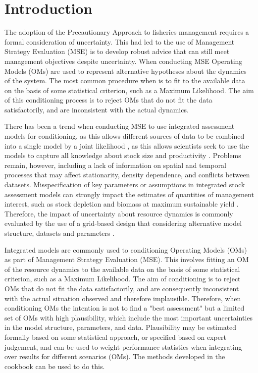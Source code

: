 \section*{Introduction}


The adoption of the Precautionary Approach to fisheries management \citep[PA,][]{garcia1996precautionary} requires a formal consideration of uncertainty. This had led to the use of Management Strategy Evaluation (MSE) is to develop robust advice that can still meet management objectives despite uncertainty. When conducting MSE Operating Models (OMs) are used to represent alternative hypotheses about the dynamics of the system. The most common procedure when is to fit to the available data on the basis of some statistical criterion, such as a Maximum Likelihood. The aim of this conditioning process is to reject OMs that do not fit the data satisfactorily, and are inconsistent with the actual dynamics.  

 There has been a trend when conducting MSE to use integrated assessment models for conditioning, as this allows different sources of data to be combined into a single model by a joint likelihood  \citep[e.g.][]{doubleday1976least,fournier1982general,maunder2013review}, as this allows scientists seek to use the models to capture all knowledge about stock size and productivity \citep{hilborn2003state}. Problems remain, however, including a lack of information on spatial and temporal processes that may affect stationarity,  density dependence, and conflicts between datasets. Misspecification of key parameters or assumptions in integrated stock assessment models can strongly impact the estimates of quantities of management interest, such as stock depletion and biomass at maximum sustainable yield \citep{mangel2013perspective}. Therefore, the impact of uncertainty about resource dynamics is commonly evaluated by the use of a grid-based design that considering alternative model structure, datasets and parameters \citep{sharma2020mse}. 
 
 Integrated models are commonly used to conditioning Operating Models (OMs) as part of Management Strategy Evaluation (MSE). This involves fitting an OM of the resource dynamics to the available data on the basis of some statistical criterion, such as a Maximum Likelihood.  The aim of conditioning is to reject OMs that do not fit the data satisfactorily, and are consequently inconsistent with the actual situation observed and therefore implausible. Therefore, when conditioning OMs the intention is not to find a "best assessment" but a limited set of OMs with high plausibility, which include the most important uncertainties in the model structure, parameters, and data. Plausibility may be estimated formally based on some statistical approach, or specified based on expert judgement, and can be used to weight performance statistics when integrating over results for different scenarios (OMs). The methods developed in the cookbook can be used to do this. 
 
